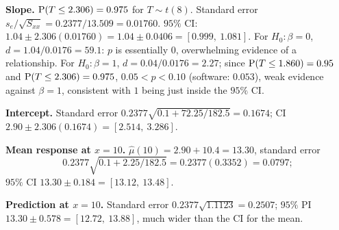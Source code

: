 \begin{example}
\textbf{Slope.} $\operatorname{P}(T\le 2.306) = 0.975$ for $T\sim t(8)$. Standard error
$s_e/\sqrt{S_{xx}} = 0.2377/13.509 = 0.01760$. $95\%$ CI:
$1.04\pm 2.306(0.01760) = 1.04\pm 0.0406 = [0.999,\ 1.081]$. For $H_0:\beta = 0$,
$d = 1.04/0.0176 = 59.1$: $p$ is essentially $0$, overwhelming evidence of a relationship.
For $H_0:\beta=1$, $d = 0.04/0.0176 = 2.27$; since $\operatorname{P}(T\le1.860)=0.95$ and
$\operatorname{P}(T\le 2.306) = 0.975$, $0.05<p<0.10$ (software: $0.053$), weak evidence against
$\beta = 1$, consistent with $1$ being just inside the $95\%$ CI.

\textbf{Intercept.} Standard error $0.2377\sqrt{0.1 + 72.25/182.5} = 0.1674$; CI
$2.90\pm2.306(0.1674) = [2.514,\ 3.286]$.

\textbf{Mean response at $x=10$.} $\hat\mu(10) = 2.90 + 10.4 = 13.30$, standard error
\[ 0.2377\sqrt{0.1 + 2.25/182.5} = 0.2377(0.3352) = 0.0797; \]
$95\%$ CI
$13.30\pm 0.184 = [13.12,\ 13.48]$.

\textbf{Prediction at $x=10$.} Standard error $0.2377\sqrt{1.1123} = 0.2507$; $95\%$ PI
$13.30\pm 0.578 = [12.72,\ 13.88]$, much wider than the CI for the mean.
\end{example}

